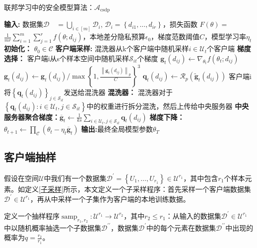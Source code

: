 \begin{algorithm}[!htb]
	\caption{联邦学习中的安全模型算法：$\mathcal{A}_{\text {csdp}}$}
	\label{联邦学习中的安全模型算法}
	\begin{algorithmic}[1]
		\footnotesize
		\STATE \textbf{输入:} 数据集$\mathcal{D} \quad=\bigcup_{i \in[m]} \mathcal{D}_{i}$, $\mathcal{D}_{i}=\left\{d_{i 1}, \ldots, d_{i r}\right\}$，损失函数 $F(\theta)=$ $\frac{1}{m r} \sum_{i=1}^{m} \sum_{j=1}^{r} f\left(\theta ; d_{i j}\right)$，本地差分隐私预算$\epsilon_{0}$，梯度范数阈值$C$，模型学习率$\eta_{t}$
		\STATE \textbf{初始化：} $\theta_{0} \in \mathcal{C}$
			\STATE \textbf{客户端采样:} 混洗器从k个客户端中随机采样$i \in \mathcal{U}_{t}$个客户端
				\STATE \textbf{梯度选择：} 客户端i从s个样本空间中随机采样$\mathcal{S}_{i t}$个梯度
					\STATE $\mathbf{g}_{t}\left(d_{i j}\right) \leftarrow \nabla_{\theta_{t}} f\left(\theta_{t} ; d_{i j}\right)$
					\STATE ${\mathbf{g}}_{t}\left(d_{i j}\right) \leftarrow \mathbf{g}_{t}\left(d_{i j}\right) / \max \left\{1, \frac{\left\|\mathbf{g}_{t}\left(d_{i j}\right)\right\|_{p}}{C}\right\}^{3}$
					\STATE $\mathbf{q}_{t}\left(d_{i j}\right) \leftarrow \mathcal{R}_{p}\left(\tilde{\mathbf{g}}_{t}\left(d_{i j}\right)\right)$
				\ENDFOR
				\STATE 客户端i将$\left\{\mathbf{q}_{t}\left(d_{i j}\right)\right\}_{j \in \mathcal{S}_{i t}}$发送给混洗器
			\ENDFOR
			\STATE \textbf{混洗器：} 混洗器对于$\left\{\boldsymbol{q}_{t}\left(d_{i j}\right): i \in \mathcal{U}_{t}, j \in \mathcal{S}_{i t}\right\}$中的权重进行拆分混洗，然后上传给中央服务器
			\STATE \textbf{中央服务器聚合梯度：}$\overline{\mathbf{g}}_{t} \leftarrow \frac{1}{k s} \sum_{i \in \mathcal{U}_{t}, j \in \mathcal{S}_{i t}} \boldsymbol{q}_{t}\left(d_{i j}\right)$
			\STATE \textbf{梯度下降：}$\theta_{t+1} \leftarrow \prod_{\mathcal{C}}\left(\theta_{t}-\eta_{t} \overline{\mathbf{g}}_{t}\right)$
		\ENDFOR
		\STATE \textbf{输出:}最终全局模型参数$\theta_{T}$

	\end{algorithmic}
\end{algorithm}

\newpage

\subsection{客户端抽样}
假设在空间$\mathcal{U}$中我们有一个数据集$\mathcal{D}^{\prime}=\left\{U_{1}, \ldots, U_{r_{1}}\right\} \in \mathcal{U}^{r_{1}}$，其中包含$r_{1}$个样本元素。如定义\ref{子采样}所示，本文定义一个子采样程序：首先采样一个客户端数据集$\mathcal{D}^{\prime} \in \mathcal{U}^{r_{1}}$，再从中采样一个子集作为客户端的本地训练数据。
\begin{define}[子采样]\label{子采样}
定义一个抽样程序$\operatorname{samp}_{r_{1}, r_{2}}: \mathcal{U}^{r_{1}} \rightarrow \mathcal{U}^{r_{2}}$，其中$r_{2} \leq r_{1}$：从输入的数据集$\mathcal{D}^{\prime} \in \mathcal{U}^{r_{1}}$ 中以随机概率抽选一个子数据集$\mathcal{D}^{\prime \prime}$，数据集$\mathcal{D}^{\prime}$中的每个元素在数据集$\mathcal{D}^{\prime \prime}$中出现的概率为$q=\frac{r_{2}}{r_{1}}$。
\end{define}

